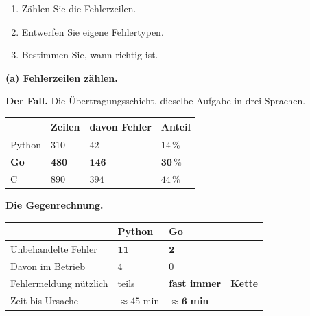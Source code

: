 \begin{aufgabe}
\begin{enumerate}[label=(\alph*)]
\item Zählen Sie die Fehlerzeilen.
\item Entwerfen Sie eigene Fehlertypen.
\item Bestimmen Sie, wann  richtig ist.
\end{enumerate}

\loesung
\textbf{(a) Fehlerzeilen zählen.}

\textbf{Der Fall.} Die Übertragungsschicht, dieselbe Aufgabe in drei Sprachen.

\begin{center}
{\small
\renewcommand{\arraystretch}{1.45}
\begin{tabular}{@{}P{2.4cm}P{2.0cm}P{2.2cm}P{2.2cm}@{}}
\toprule
& \textbf{Zeilen} & \textbf{davon Fehler} & \textbf{Anteil}\\
\midrule
Python & $310$ & $42$ & $14\,\%$\\
\textbf{Go} & $\mathbf{480}$ & $\mathbf{146}$ & $\mathbf{30\,\%}$\\
C & $890$ & $394$ & $44\,\%$\\
\bottomrule
\end{tabular}}
\end{center}

\begin{center}
\begin{minipage}{0.88\textwidth}
\end{minipage}
\end{center}

\textbf{Die Gegenrechnung.}

\begin{center}
{\small
\renewcommand{\arraystretch}{1.45}
\begin{tabular}{@{}P{2.8cm}P{2.0cm}P{2.0cm}P{1.8cm}@{}}
\toprule
& \textbf{Python} & \textbf{Go} & \\
\midrule
Unbehandelte Fehler & $\mathbf{11}$ & $\mathbf{2}$ & \\
Davon im Betrieb & $4$ & $0$ & \\
Fehlermeldung nützlich & \textcolor{mittel}{teils} & \textcolor{gruen}{\textbf{fast immer}} & \textbf{Kette}\\
Zeit bis Ursache & $\approx45$ min & \textcolor{gruen}{$\approx\mathbf{6}$ \textbf{min}} & \\
\bottomrule
\end{tabular}}
\end{center}


\end{aufgabe}
